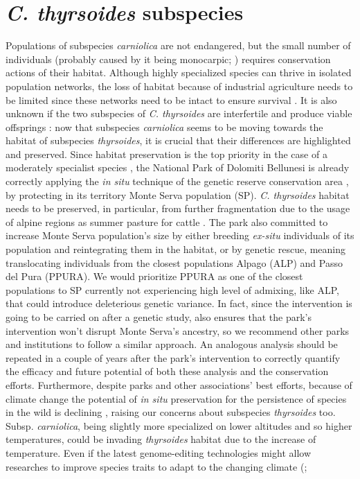 \documentclass[a4paper, 12pt]{report}
\begin{document}
\section{\textit{C. thyrsoides} subspecies}
Populations of subspecies \textit{carniolica} are not endangered, but the small number of individuals (probably caused by it being monocarpic; \cite{aegisdottirIsolatedPopulationsRare2009}) requires conservation actions of their habitat. Although highly specialized species can thrive in isolated population networks, the loss of habitat because of industrial agriculture needs to be limited since these networks need to be intact to ensure survival \parencite{habelBurdenGeneticDiversity2012}. It is also unknown if the two subspecies of \textit{C. thyrsoides} are interfertile and produce viable offsprings \parencite{scheepensDifferentiationMorphologyFlowering2011}: now that subspecies \textit{carniolica} seems to be moving towards the habitat of subspecies \textit{thyrsoides}, it is crucial that their differences are highlighted and preserved. Since habitat preservation is the top priority in the case of a moderately specialist species \parencite{habelBurdenGeneticDiversity2012}, the National Park of Dolomiti Bellunesi is already correctly applying the \textit{in situ} technique of the genetic reserve conservation area \parencite{salgotraGeneticDiversityConservation2023}, by protecting in its territory Monte Serva population (SP). \textit{C. thyrsoides} habitat needs to be preserved, in particular, from further fragmentation due to the usage of alpine regions as summer pasture for cattle \parencite{freiHighGeneticDifferentiation2012}. The park also committed to increase Monte Serva population's size by either breeding \textit{ex-situ} individuals of its population and reintegrating them in the habitat, or by genetic rescue, meaning translocating individuals from the closest populations \parencite{suppleConservationBiodiversityGenomics2018} Alpago (ALP) and Passo del Pura (PPURA). We would prioritize PPURA as one of the closest populations to SP currently not experiencing high level of admixing, like ALP, that could introduce deleterious genetic variance. In fact, since the intervention is going to be carried on after a genetic study, also ensures that the park's intervention won't disrupt Monte Serva's ancestry, so we recommend other parks and institutions to follow a similar approach. An analogous analysis should be repeated in a couple of years after the park's intervention to correctly quantify the efficacy and future potential of both these analysis and the conservation efforts. Furthermore, despite parks and other associations' best efforts, because of climate change the potential of \textit{in situ} preservation for the persistence of species in the wild is declining \parencite{iucn/sscGuidelinesUseEx2014}, raising our concerns about subspecies \textit{thyrsoides} too. Subsp. \textit{carniolica}, being slightly more specialized on lower altitudes and so higher temperatures, could be invading \textit{thyrsoides} habitat due to the increase of temperature. Even if the latest genome-editing technologies might allow researches to improve species traits to adapt to the changing climate (\cite{suppleConservationBiodiversityGenomics2018}; 
\end{document}
